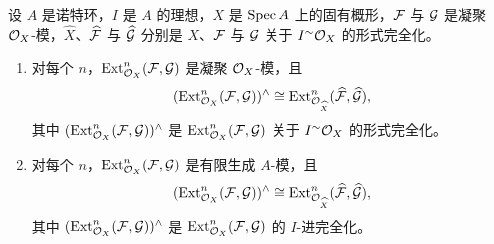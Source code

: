 \begin{proposition}\label{it:2.7.8}
设 $A$ 是诺特环，$I$ 是 $A$ 的理想，$X$ 是 $\Spec A$ 上的固有概形，$\cF$ 与 $\cG$ 是凝聚 $\cO_X$-模，$\widehat{X}$、$\widehat{\cF}$ 与 $\widehat{\cG}$ 分别是 $X$、$\cF$ 与 $\cG$ 关于 $I^{\sim}\cO_X$ 的形式完全化。
\begin{enumerate}[label=(\roman*),leftmargin=2.8em]
\item 对每个 $n$，$\Ext^n_{\cO_X}(\cF,\cG)$ 是凝聚 $\cO_X$-模，且
\begin{equation*}
(\Ext^n_{\cO_X}(\cF,\cG))^{\wedge}\cong\Ext^n_{\cO_{\widehat{X}}}(\widehat{\cF},\widehat{\cG}),
\end{equation*}
其中 $(\Ext^n_{\cO_X}(\cF,\cG))^{\wedge}$ 是 $\Ext^n_{\cO_X}(\cF,\cG)$ 关于 $I^{\sim}\cO_X$ 的形式完全化。
\item 对每个 $n$，$\Ext^n_{\cO_X}(\cF,\cG)$ 是有限生成 $A$-模，且
\begin{equation*}
(\Ext^n_{\cO_X}(\cF,\cG))^{\wedge}\cong\Ext^n_{\cO_{\widehat{X}}}(\widehat{\cF},\widehat{\cG}),
\end{equation*}
其中 $(\Ext^n_{\cO_X}(\cF,\cG))^{\wedge}$ 是 $\Ext^n_{\cO_X}(\cF,\cG)$ 的 $I$-进完全化。
\end{enumerate}
\end{proposition}

